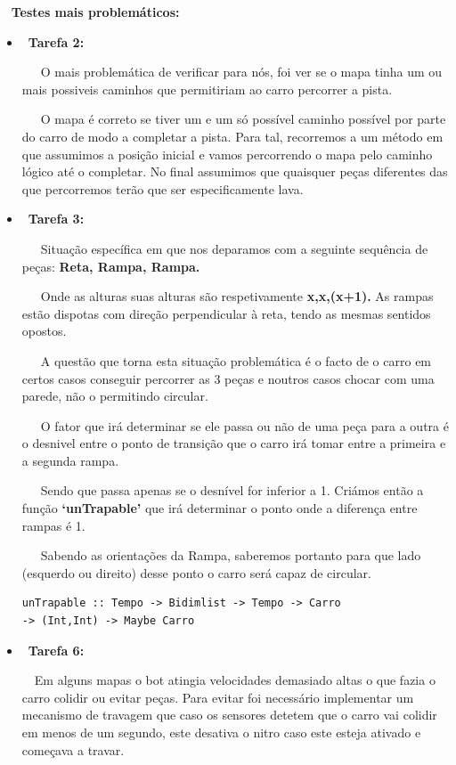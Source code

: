 \documentclass[a4paper]{report} %
\begin{document}
    \par \  { \Large \textbf{Testes mais problemáticos:} } 
  { \normalsize
    \begin {itemize}
        \item \ \textbf{Tarefa 2:}
        \par \ \ \ O mais problemática de verificar para nós, foi ver se o mapa tinha um ou mais possiveis caminhos que permitiriam ao carro percorrer a pista. 
        \par \ \ \ O mapa é correto se tiver um e um só possível caminho possível por parte do carro de modo a completar a pista. Para tal, recorremos a um método em que assumimos a posição inicial e vamos percorrendo o mapa pelo caminho lógico até o completar. No final assumimos que quaisquer peças diferentes das que percorremos terão que ser especificamente lava.
        
        
        \item \ \textbf{Tarefa 3:} 
        \par \ \ \ Situação específica em que nos deparamos com a seguinte sequência de peças: \textbf{Reta, Rampa, Rampa.}
        \par \ \ \ Onde as alturas suas alturas são respetivamente \textbf {x,x,(x+1).} As rampas estão dispotas com direção perpendicular à reta, tendo as mesmas sentidos opostos. 
        \par \ \ \ A questão que torna esta situação problemática é o facto de o carro em certos casos conseguir percorrer as 3 peças e noutros casos chocar com uma parede, não o permitindo circular.
        \par \ \ \ O fator que irá determinar se ele passa ou não de uma peça para a outra é o desnivel entre o ponto de transição que o carro irá tomar entre a primeira e a segunda rampa. 
        \par \ \ \ Sendo que passa apenas se o desnível for inferior a 1. Criámos então a função \textbf{‘unTrapable’} que irá determinar o ponto onde a diferença entre rampas é 1. 
        \par \ \ \ Sabendo as orientações da Rampa, saberemos portanto para que lado (esquerdo ou direito) desse ponto o carro será capaz de circular.
        
                           \begin{verbatim}
unTrapable :: Tempo -> Bidimlist -> Tempo -> Carro 
-> (Int,Int) -> Maybe Carro
                            \end{verbatim}

        \item \ \textbf{Tarefa 6:} 
        \par \ \ Em alguns mapas o bot atingia velocidades demasiado altas o que fazia o carro colidir ou evitar peças. Para evitar foi necessário implementar um mecanismo de travagem que caso os sensores detetem que o carro vai colidir em menos de um segundo, este desativa o nitro caso este esteja ativado e começava a travar. 
    \end {itemize}
}
\end{document}
